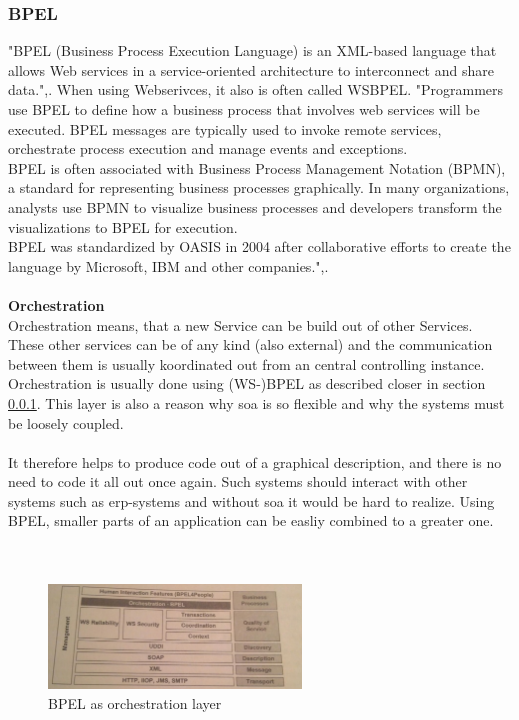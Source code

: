 \documentclass[12pt]{article}
\begin{document}
\subsubsection{BPEL}
\label{sec:bpel}
"BPEL (Business Process Execution Language) is an XML-based language that allows Web services in a service-oriented architecture to interconnect and share data.",\cite{bpelsearchsoa}. When using Webserivces, it also is often called WSBPEL. "Programmers use BPEL to define how a business process that involves web services will be executed. BPEL messages are typically used to invoke remote services, orchestrate process execution and manage events and exceptions.\\
BPEL is often associated with Business Process Management Notation (BPMN), a standard for representing business processes graphically. In many organizations, analysts use BPMN to visualize business processes and developers transform the visualizations to BPEL for execution.\\
BPEL was standardized by OASIS in 2004 after collaborative efforts to create the language by Microsoft, IBM and other companies.",\cite{bpelsearchsoa}.\\
\\
\textbf{Orchestration}\\
Orchestration means, that a new Service can be build out of other Services. 
These other services can be of any kind (also external) and the communication between them is usually koordinated out from an central controlling instance. Orchestration is usually done using (WS-)BPEL as described closer in section \ref{sec:bpel}. This layer is also a reason why \gls{soa} is so flexible and why the systems must be loosely coupled. \cite[page 29]{soagoesreal}\\ \\
It therefore helps to produce code out of a graphical description, and there is no need to code it all out once again. Such systems should interact with other systems such as \gls{erp}-systems and without \gls{soa} it would be hard to realize. Using BPEL, smaller parts of an application can be easliy combined to a greater one. \cite[page 18]{soagoesreal} \\ \\
\\
\begin{figure}[here!]
	\centering
	\includegraphics[width=0.6\textwidth]{images/page19}
	\caption{BPEL as orchestration layer \cite[page 19]{soagoesreal}}
	\label{fig:bpel}
	\end{figure}
	\FloatBarrier
\end{document}
